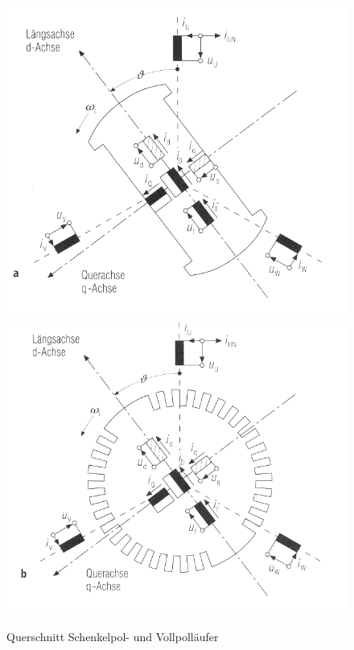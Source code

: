 \documentclass{scrartcl}
\begin{document}
\begin{onehalfspace}
	\begin{figure}[H]
	\centering
	\includegraphics[scale=0.85]{img/schenkelpol.jpg}
	\includegraphics[scale=0.85]{img/vollpol.jpg}
	\caption{Querschnitt Schenkelpol- und Vollpolläufer \cite[S. 125]{Oeding2011} }
	\end{figure}



\end{onehalfspace}
\end{document}
